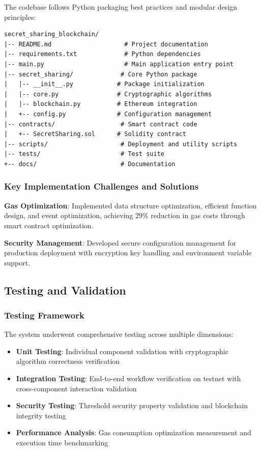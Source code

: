 \documentclass[12pt,a4paper]{article}
\begin{document}
The codebase follows Python packaging best practices and modular design principles:

\begin{lstlisting}[caption=Project Structure, label=lst:project_structure]
secret_sharing_blockchain/
|-- README.md                    # Project documentation
|-- requirements.txt             # Python dependencies
|-- main.py                      # Main application entry point
|-- secret_sharing/             # Core Python package
|   |-- __init__.py            # Package initialization
|   |-- core.py                # Cryptographic algorithms
|   |-- blockchain.py          # Ethereum integration
|   +-- config.py              # Configuration management
|-- contracts/                  # Smart contract code
|   +-- SecretSharing.sol      # Solidity contract
|-- scripts/                    # Deployment and utility scripts
|-- tests/                      # Test suite
+-- docs/                       # Documentation
\end{lstlisting}

\subsubsection{Key Implementation Challenges and Solutions}

\textbf{Gas Optimization}: Implemented data structure optimization, efficient function design, and event optimization, achieving 29\% reduction in gas costs through smart contract optimization.

\textbf{Security Management}: Developed secure configuration management for production deployment with encryption key handling and environment variable support.

\subsection{Testing and Validation}

\subsubsection{Testing Framework}

The system underwent comprehensive testing across multiple dimensions:

\begin{itemize}[leftmargin=15pt]
    \item \textbf{Unit Testing}: Individual component validation with cryptographic algorithm correctness verification
    \item \textbf{Integration Testing}: End-to-end workflow verification on testnet with cross-component interaction validation
    \item \textbf{Security Testing}: Threshold security property validation and blockchain integrity testing
    \item \textbf{Performance Analysis}: Gas consumption optimization measurement and execution time benchmarking
\end{itemize}
\end{document}
